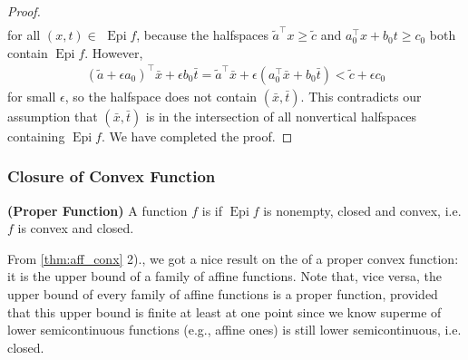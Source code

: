 \documentclass{article}
\newcommand{\bfs}[1]{\textbf{({#1}) }}
\newcommand{\Epi}{\operatorname{Epi} }
\begin{document}
\begin{proof}
\begin{align*}
\end{align*}
for all $(x, t) \in$ $\Epi f$, because the halfspaces $\tilde{a}^{\top} x \geq \tilde{c}$ and $a_{0}^{\top} x+b_{0} t \geq c_{0}$ both contain $\Epi f$. However,
\begin{align*}
\left(\tilde{a}+\epsilon a_{0}\right)^{\top} \bar{x}+\epsilon b_{0} \bar{t}=\tilde{a}^{\top} \bar{x}+\epsilon\left(a_{0}^{\top} \bar{x}+b_{0} \bar{t}\right)<\tilde{c}+\epsilon c_{0}
\end{align*}
for small $\epsilon$, so the halfspace does not contain $(\bar{x}, \bar{t})$. This contradicts our assumption that $(\bar{x}, \bar{t})$ is in the intersection of all nonvertical halfspaces containing $\Epi f$. We have completed the proof.
\end{proof}

\subsubsection{Closure of Convex Function}\label{eq:clff}
\begin{defa}\bfs{Proper Function}
A function $f$ is  if $\Epi f$ is nonempty, closed and convex, i.e. $f$ is convex and closed.
\end{defa}

From \cref{thm:aff_conx} 2)., we got a nice result on the  of a proper convex function: it is the upper bound of a family of affine functions. Note that, vice versa, the upper bound of every family of affine functions is a proper function, provided that this upper bound is finite at least at one point since we know superme of lower semicontinuous functions (e.g., affine ones) is still lower semicontinuous, i.e. closed.
\end{document}
